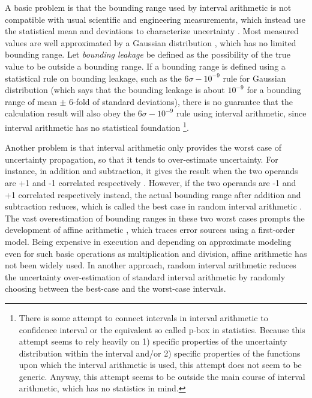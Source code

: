 \documentclass[twoside]{article}
\numberwithin{equation}{section}
\begin{document}
A basic problem is that the bounding range used by interval arithmetic is not compatible with usual scientific and engineering measurements, which instead use the statistical mean and deviations to characterize uncertainty \cite{Statistical_Methods}\cite{Precisions_Physical_Measurements}.  
Most measured values are well approximated by a Gaussian distribution \cite{Statistical_Methods}\cite{Precisions_Physical_Measurements}\cite{Probability_Statistics}, which has no limited bounding range.  
Let \emph{bounding leakage} be defined as the possibility of the true value to be outside a bounding range.  
If a bounding range is defined using a statistical rule on bounding leakage, such as the $6\sigma-10^{-9}$ rule for Gaussian distribution \cite{Probability_Statistics} (which says that the bounding leakage is about $10^{-9}$ for a bounding range of mean $\pm$ 6-fold of standard deviations), there is no guarantee that the calculation result will also obey the $6\sigma-10^{-9}$ rule using interval arithmetic, since interval arithmetic has no statistical foundation
\footnote{
There is some attempt \cite{Statistics_For_Interval_Arithmetic} to connect intervals in interval arithmetic to confidence interval or the equivalent so called p-box in statistics. 
Because this attempt seems to rely heavily on 1) specific properties of the uncertainty distribution within the interval and/or 2) specific properties of the functions upon which the interval arithmetic is used, this attempt does not seem to be generic. 
Anyway, this attempt seems to be outside the main course of interval arithmetic, which has no statistics in mind.
}.  

Another problem is that interval arithmetic only provides the worst case of uncertainty propagation, so that it tends to over-estimate uncertainty.  
For instance, in addition and subtraction, it gives the result when the two operands are +1 and -1 correlated respectively \cite{Affine_Arithmetic}.  
However, if the two operands are -1 and +1 correlated respectively instead, the actual bounding range after addition and subtraction reduces, which is called the best case in random interval arithmetic \cite{Random_Interval_Arithmetic}.  
The vast overestimation of bounding ranges in these two worst cases prompts the development of affine arithmetic \cite{Affine_Arithmetic}\cite{Affine_Arithmetic_book}, which traces error sources using a first-order model.  
Being expensive in execution and depending on approximate modeling even for such basic operations as multiplication and division, affine arithmetic has not been widely used.  
In another approach, random interval arithmetic \cite{Random_Interval_Arithmetic} reduces the uncertainty over-estimation of standard interval arithmetic by randomly choosing between the best-case and the worst-case intervals.  
\end{document}
